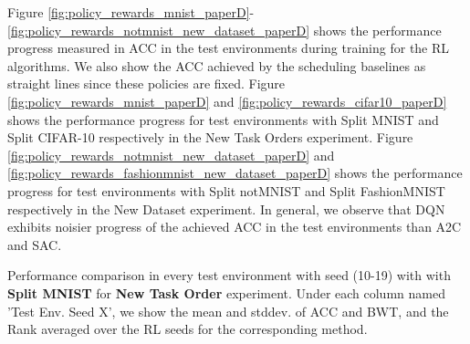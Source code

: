 Figure \ref{fig:policy_rewards_mnist_paperD}-\ref{fig:policy_rewards_notmnist_new_dataset_paperD} shows the performance progress measured in ACC in the test environments during training for the RL algorithms. We also show the ACC achieved by the scheduling baselines as straight lines since these policies are fixed. Figure \ref{fig:policy_rewards_mnist_paperD} and \ref{fig:policy_rewards_cifar10_paperD} shows the performance progress for test environments with Split MNIST and Split CIFAR-10 respectively in the New Task Orders experiment. Figure \ref{fig:policy_rewards_notmnist_new_dataset_paperD} and \ref{fig:policy_rewards_fashionmnist_new_dataset_paperD} shows the performance progress for test environments with Split notMNIST and Split FashionMNIST respectively in the New Dataset experiment. In general, we observe that DQN exhibits noisier progress of the achieved ACC in the test environments than A2C and SAC. 






\begin{table}[t]
	\centering
	\caption{Performance comparison in every test environment with seed (10-19) with with {\bf Split MNIST} for \textbf{New Task Order} experiment. Under each column named 'Test Env. Seed X', we show the mean and stddev. of ACC and BWT, and the Rank averaged over the RL seeds for the corresponding method. 
	}
	\vspace{-3mm}
	\resizebox{0.85\textwidth}{!}{
		
	}
	\label{tab:environment_results_new_task_order_mnist}
\end{table}

